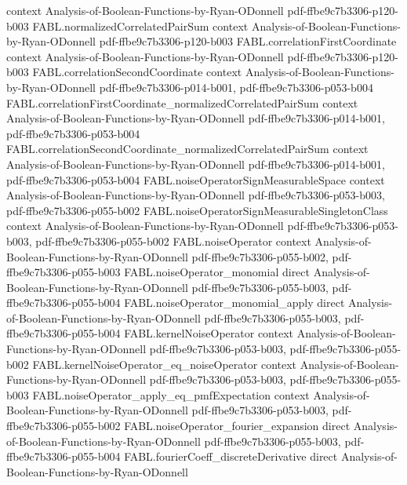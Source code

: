 \begin{theorem}
  {context}
  {Analysis-of-Boolean-Functions-by-Ryan-ODonnell}
  {pdf-ffbe9c7b3306-p120-b003}
\proofstep
  {FABL.normalizedCorrelatedPairSum}
  {context}
  {Analysis-of-Boolean-Functions-by-Ryan-ODonnell}
  {pdf-ffbe9c7b3306-p120-b003}
\proofstep
  {FABL.correlationFirstCoordinate}
  {context}
  {Analysis-of-Boolean-Functions-by-Ryan-ODonnell}
  {pdf-ffbe9c7b3306-p120-b003}
\proofstep
  {FABL.correlationSecondCoordinate}
  {context}
  {Analysis-of-Boolean-Functions-by-Ryan-ODonnell}
  {pdf-ffbe9c7b3306-p014-b001,
    pdf-ffbe9c7b3306-p053-b004}
\proofstep
  {FABL.correlationFirstCoordinate_normalizedCorrelatedPairSum}
  {context}
  {Analysis-of-Boolean-Functions-by-Ryan-ODonnell}
  {pdf-ffbe9c7b3306-p014-b001,
    pdf-ffbe9c7b3306-p053-b004}
\proofstep
  {FABL.correlationSecondCoordinate_normalizedCorrelatedPairSum}
  {context}
  {Analysis-of-Boolean-Functions-by-Ryan-ODonnell}
  {pdf-ffbe9c7b3306-p014-b001,
    pdf-ffbe9c7b3306-p053-b004}
\proofstep
  {FABL.noiseOperatorSignMeasurableSpace}
  {context}
  {Analysis-of-Boolean-Functions-by-Ryan-ODonnell}
  {pdf-ffbe9c7b3306-p053-b003,
    pdf-ffbe9c7b3306-p055-b002}
\proofstep
  {FABL.noiseOperatorSignMeasurableSingletonClass}
  {context}
  {Analysis-of-Boolean-Functions-by-Ryan-ODonnell}
  {pdf-ffbe9c7b3306-p053-b003,
    pdf-ffbe9c7b3306-p055-b002}
\proofstep
  {FABL.noiseOperator}
  {context}
  {Analysis-of-Boolean-Functions-by-Ryan-ODonnell}
  {pdf-ffbe9c7b3306-p055-b002,
    pdf-ffbe9c7b3306-p055-b003}
\proofstep
  {FABL.noiseOperator_monomial}
  {direct}
  {Analysis-of-Boolean-Functions-by-Ryan-ODonnell}
  {pdf-ffbe9c7b3306-p055-b003,
    pdf-ffbe9c7b3306-p055-b004}
\proofstep
  {FABL.noiseOperator_monomial_apply}
  {direct}
  {Analysis-of-Boolean-Functions-by-Ryan-ODonnell}
  {pdf-ffbe9c7b3306-p055-b003,
    pdf-ffbe9c7b3306-p055-b004}
\proofstep
  {FABL.kernelNoiseOperator}
  {context}
  {Analysis-of-Boolean-Functions-by-Ryan-ODonnell}
  {pdf-ffbe9c7b3306-p053-b003,
    pdf-ffbe9c7b3306-p055-b002}
\proofstep
  {FABL.kernelNoiseOperator_eq_noiseOperator}
  {context}
  {Analysis-of-Boolean-Functions-by-Ryan-ODonnell}
  {pdf-ffbe9c7b3306-p053-b003,
    pdf-ffbe9c7b3306-p055-b003}
\proofstep
  {FABL.noiseOperator_apply_eq_pmfExpectation}
  {context}
  {Analysis-of-Boolean-Functions-by-Ryan-ODonnell}
  {pdf-ffbe9c7b3306-p053-b003,
    pdf-ffbe9c7b3306-p055-b002}
\proofstep
  {FABL.noiseOperator_fourier_expansion}
  {direct}
  {Analysis-of-Boolean-Functions-by-Ryan-ODonnell}
  {pdf-ffbe9c7b3306-p055-b003,
    pdf-ffbe9c7b3306-p055-b004}
\proofstep
  {FABL.fourierCoeff_discreteDerivative}
  {direct}
  {Analysis-of-Boolean-Functions-by-Ryan-ODonnell}

\end{theorem}
